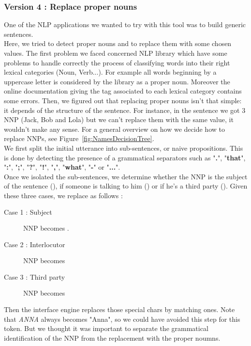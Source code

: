 \subsubsection{Version 4 : Replace proper nouns} %
\label{ssub:version_4_replace_proper_nouns}
One of the NLP applications we wanted to try with this tool was to build generic sentences.\\
Here, we tried to detect proper nouns and to replace them with some chosen values. The first problem we faced concerned NLP library which have some problems to handle correctly the process of classifying words into their right lexical categories (Noun, Verb...). For example all words beginning by a uppercase letter is considered by the library as a proper noun. Moreover the online documentation giving the tag associated to each lexical category contains some errors.
Then, we figured out that replacing proper nouns isn't that simple: it depends of the structure of the sentence.
For instance, in the sentence  we got 3 NNP (Jack, Bob and Lola) but we can't replace them with the same value, it wouldn't make any sense.
For a general overview on how we decide how to replace NNPs, see Figure~\ref{fig:NamesDecisionTree}. \\
We first split the initial utterance into sub-sentences, or naive propositions.
This is done by detecting the presence of a grammatical separators such as "\textbf{.}", "\textbf{that}", "\textbf{:}", "\textbf{;}", "\textbf{?}", "\textbf{!}", "\textbf{,}", "\textbf{what}", "\textbf{-}" or "\textbf{...}".\\
Once we isolated the sub-sentences, we determine whether the NNP is the subject of the sentence (), if someone is talking to him () or if he's a third party ().
Given these three cases, we replace as follows :
\begin{description}
    \item[Case 1 : Subject] NNP becomes .
    \item[Case 2 : Interlocutor] NNP becomes 
    \item[Case 3 : Third party] NNP becomes 
\end{description}
Then the interface engine replaces those special chars by matching ones.
Note that \textit{ANNA} always becomes "Anna", so we could have avoided this step for this token.
But we thought it was important to separate the grammatical identification of the NNP from the replacement with the proper noumns.
